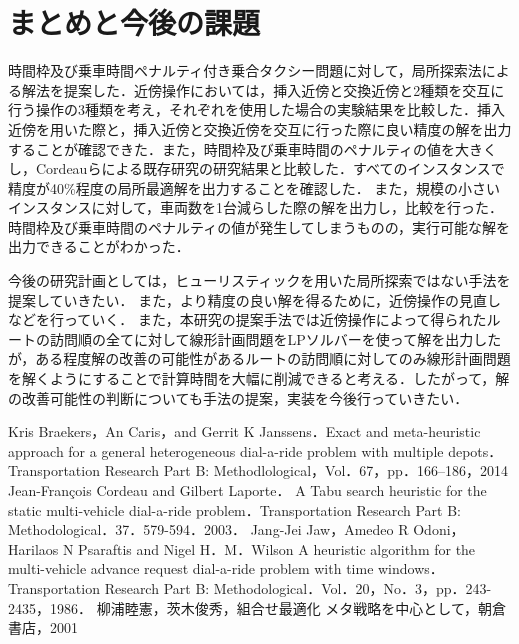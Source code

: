 \documentclass[a4j，11pt，twocolumn]{jsarticle}
\begin{document}
\section{まとめと今後の課題}
時間枠及び乗車時間ペナルティ付き乗合タクシー問題に対して，局所探索法による解法を提案した．近傍操作においては，挿入近傍と交換近傍と2種類を交互に行う操作の3種類を考え，それぞれを使用した場合の実験結果を比較した．挿入近傍を用いた際と，挿入近傍と交換近傍を交互に行った際に良い精度の解を出力することが確認できた．また，時間枠及び乗車時間のペナルティの値を大きくし，Cordeauらによる既存研究の研究結果と比較した．すべてのインスタンスで精度が40\%程度の局所最適解を出力することを確認した．
また，規模の小さいインスタンスに対して，車両数を1台減らした際の解を出力し，比較を行った．時間枠及び乗車時間のペナルティの値が発生してしまうものの，実行可能な解を出力できることがわかった．

今後の研究計画としては，ヒューリスティックを用いた局所探索ではない手法を提案していきたい．
また，より精度の良い解を得るために，近傍操作の見直しなどを行っていく．
また，本研究の提案手法では近傍操作によって得られたルートの訪問順の全てに対して線形計画問題をLPソルバーを使って解を出力したが，ある程度解の改善の可能性があるルートの訪問順に対してのみ線形計画問題を解くようにすることで計算時間を大幅に削減できると考える．したがって，解の改善可能性の判断についても手法の提案，実装を今後行っていきたい．

\begin{thebibliography}{99}
   Kris Braekers，An Caris，and Gerrit K Janssens．Exact and meta-heuristic approach for a general heterogeneous dial-a-ride problem with multiple depots．Transportation Research Part B: Methodlological，Vol．67，pp．166--186，2014
   Jean-François Cordeau and Gilbert Laporte． \，A Tabu search heuristic for the static multi-vehicle dial-a-ride problem．Transportation Research Part B: Methodological．37．579-594．2003．
   Jang-Jei Jaw，Amedeo R Odoni，Harilaos N Psaraftis and Nigel H．M．Wilson \，A heuristic algorithm for the multi-vehicle advance request dial-a-ride problem with time windows．Transportation Research Part B: Methodological．Vol．20，No．3，pp．243-2435，1986．
   柳浦睦憲，茨木俊秀，組合せ最適化 メタ戦略を中心として，朝倉書店，2001
\end{thebibliography}
\end{document}
